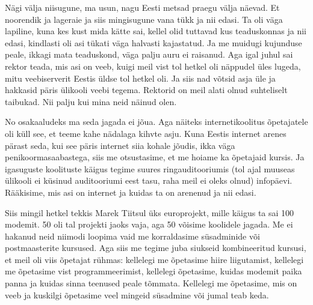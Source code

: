 
Nägi välja niisugune, ma usun, nagu Eesti metsad praegu välja näevad. Et 
noorendik ja lageraie ja siis mingisugune vana tükk ja nii edasi. Ta oli väga 
lapiline, kuna kes kust mida kätte sai, kellel olid tuttavad kus teaduskonnas 
ja nii edasi, kindlasti oli asi tükati väga halvasti kajastatud. Ja me  muidugi 
kujunduse peale, ikkagi mata teaduskond, väga palju auru ei raisanud. Aga igal 
juhul sai rektor teada, mis asi on veeb, kuigi meil vist tol hetkel oli 
näppudel üles lugeda, mitu veebiserverit Eestis üldse tol hetkel oli. Ja siis 
nad võtsid asja üle ja hakkasid päris ülikooli veebi tegema. Rektorid on meil 
alati olnud suhteliselt taibukad. Nii palju kui mina neid näinud olen. 


No osakaaludeks ma seda jagada ei jõua. Aga näiteks internetikoolitus 
õpetajatele oli küll see, et teeme kahe nädalaga kihvte asju. Kuna Eestis 
internet arenes pärast seda, kui see päris internet siia kohale jõudis,  ikka 
väga penikoormasaabastega, siis me otsustasime, et me hoiame ka õpetajaid 
kursis. Ja igasuguste koolituste käigus tegime  suures ringauditooriumis (tol 
ajal muuseas ülikooli ei küsinud auditooriumi eest tasu, raha meil ei oleks 
olnud) infopäevi. Rääkisime, mis asi on internet ja kuidas ta on arenenud ja 
nii edasi. 

Siis mingil hetkel tekkis Marek Tiitsul üks 
europrojekt, mille käigus ta sai 100 modemit. 50 oli tal projekti jaoks vaja, 
aga 50 võisime koolidele jagada. Me ei hakanud neid niimodi loopima vaid me 
korraldasime süsadminide või postmaasterite kursused. Aga siis me tegime juba 
siukseid kombineeritud kursusi, et meil oli viis õpetajat rühmas: kellelegi me 
õpetasime hiire liigutamist, kellelegi me õpetasime vist  programmeerimist, 
kellelegi õpetasime, kuidas modemit paika panna ja kuidas sinna teenused peale 
tõmmata. Kellelegi me õpetasime, mis on veeb ja kuskilgi õpetasime veel mingeid 
süsadmine või jumal teab keda. 

